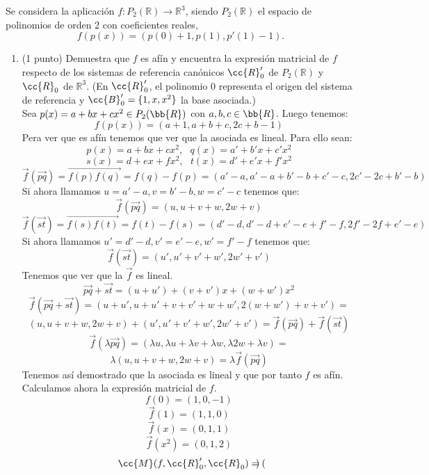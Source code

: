 \documentclass[12pt]{article}
\begin{document}
        \begin{ejercicio}[2 puntos]
        Se considera la aplicación \( f : P_2(\mathbb{R}) \to \mathbb{R}^3 \), siendo \( P_2(\mathbb{R}) \) el espacio de polinomios de orden 2 con coeficientes reales,
        \[
        f(p(x)) = (p(0) + 1, p(1), p'(1)-1).
        \]
        
        \begin{enumerate}
        \item (1 punto) Demuestra que \( f \) es afín y encuentra la expresión matricial de \( f \) respecto de los sistemas de referencia canónicos
        \( \cc{R}_0' \) de \( P_2(\mathbb{R}) \) y \( \cc{R}_0 \) de \( \mathbb{R}^3 \). (En \( \cc{R}_0' \), el polinomio $0$ representa el origen del sistema de referencia y
        \( \cc{B}_0' = \{1, x, x^2\} \) la base asociada.)\\
        Sea $p(x)=a+bx+cx^2 \in P_2(\bb{R})$ con $a,b,c \in \bb{R}$. Luego tenemos:
        $$f(p(x))=(a+1,a+b+c,2c+b-1)$$
        Pera ver que es afín tenemos que ver que la asociada es lineal. Para ello sean: 
        $$p(x)=a+bx+cx^2, \mbox{    } q(x)=a'+b'x+c'x^2$$ 
        $$s(x)=d+ex+fx^2, \mbox{    } t(x)=d'+e'x+f'x^2$$
        $$\vec{f}(\vec{pq})=\vec{f(p)f(q)} = f(q) - f(p) = (a'-a,a'-a + b'-b + c'-c, 2c'-2c + b'-b)$$
        Si ahora llamamos $u=a'-a, v=b'-b, w=c'-c$ tenemos que:
        $$\vec{f}(\vec{pq}) = (u,u+v+w,2w+v)$$
        $$\vec{f}(\vec{st})=\vec{f(s)f(t)} = f(t) - f(s) = (d'-d,d'-d + e'-e + f'-f, 2f'-2f + e'-e)$$
        Si ahora llamamos $u'=d'-d, v'=e'-e, w'=f'-f$ tenemos que:
        $$\vec{f}(\vec{st}) = (u',u'+v'+w',2w'+v')$$
        Tenemos que ver que la $\vec{f}$ es lineal. 
        $$\vec{pq} + \vec{st} = (u+u') + (v+v')x + (w+w')x^2$$
        $$\vec{f}(\vec{pq} + \vec{st})= (u+u',u+u'+v+v'+w+w',2(w+w')+v+v') = $$ 
        $$(u,u+v+w,2w+v) + (u',u'+v'+w',2w'+v') = \vec{f}(\vec{pq}) + \vec{f}(\vec{st})$$
        $$\vec{f}(\lambda\vec{pq}) = (\lambda u,\lambda u+\lambda v+\lambda w,\lambda2w+\lambda v)= $$
        $$ \lambda (u,u+v+w,2w+v) = \lambda \vec{f}(\vec{pq})$$
        Tenemos así demostrado que la asociada es lineal y que por tanto $f$ es afín.\\
        Calculamos ahora la expresión matricial de $f$.
        $$f(0) = (1,0,-1)$$
        $$\vec{f}(1)=(1,1,0)$$
        $$\vec{f}(x)=(0,1,1)$$
        $$\vec{f}(x^2)=(0,1,2)$$
        $$\cc{M}(f,\cc{R}'_0,\cc{R}_0) = 
                \begin{pmatrix}

\end{pmatrix}$$
\end{enumerate}
\end{ejercicio}
\end{document}
